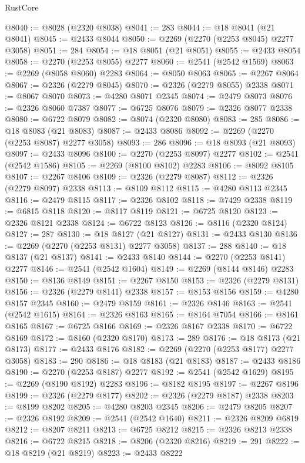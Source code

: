 \begin{lexlean}{RustCore}
\begin{coremodule}
@8040 := @8028 (@2320 @8038)
@8041 := 283
@8044 := @18 @8041 (@21 @8041)
@8045 := @2433 @8044
@8050 := @2269 (@2270 (@2253 @8045) @2277 @3058)
@8051 := 284
@8054 := @18 @8051 (@21 @8051)
@8055 := @2433 @8054
@8058 := @2270 (@2253 @8055) @2277
@8060 := @2541 (@2542 @1569)
@8063 := @2269 (@8058 @8060) @2283
@8064 := @8050 @8063
@8065 := @2267 @8064
@8067 := @2326 (@2279 @8045)
@8070 := @2326 (@2279 @8055) @2338
@8071 := @8067 @8070
@8073 := @4280 @8071 @2345
@8074 := @2479 @8073
@8076 := @2326 @8060 @7387
@8077 := @6725 @8076
@8079 := @2326 @8077 @2338
@8080 := @6722 @8079
@8082 := @8074 (@2320 @8080)
@8083 := 285
@8086 := @18 @8083 (@21 @8083)
@8087 := @2433 @8086
@8092 := @2269 (@2270 (@2253 @8087) @2277 @3058)
@8093 := 286
@8096 := @18 @8093 (@21 @8093)
@8097 := @2433 @8096
@8100 := @2270 (@2253 @8097) @2277
@8102 := @2541 (@2542 @1586)
@8105 := @2269 (@8100 @8102) @2283
@8106 := @8092 @8105
@8107 := @2267 @8106
@8109 := @2326 (@2279 @8087)
@8112 := @2326 (@2279 @8097) @2338
@8113 := @8109 @8112
@8115 := @4280 @8113 @2345
@8116 := @2479 @8115
@8117 := @2326 @8102
@8118 := @7429 @2338
@8119 := @6815 @8118
@8120 := @8117 @8119
@8121 := @6725 @8120
@8123 := @2326 @8121 @2338
@8124 := @6722 @8123
@8126 := @8116 (@2320 @8124)
@8127 := 287
@8130 := @18 @8127 (@21 @8127)
@8131 := @2433 @8130
@8136 := @2269 (@2270 (@2253 @8131) @2277 @3058)
@8137 := 288
@8140 := @18 @8137 (@21 @8137)
@8141 := @2433 @8140
@8144 := @2270 (@2253 @8141) @2277
@8146 := @2541 (@2542 @1604)
@8149 := @2269 (@8144 @8146) @2283
@8150 := @8136 @8149
@8151 := @2267 @8150
@8153 := @2326 (@2279 @8131)
@8156 := @2326 (@2279 @8141) @2338
@8157 := @8153 @8156
@8159 := @4280 @8157 @2345
@8160 := @2479 @8159
@8161 := @2326 @8146
@8163 := @2541 (@2542 @1615)
@8164 := @2326 @8163
@8165 := @8164 @7054
@8166 := @8161 @8165
@8167 := @6725 @8166
@8169 := @2326 @8167 @2338
@8170 := @6722 @8169
@8172 := @8160 (@2320 @8170)
@8173 := 289
@8176 := @18 @8173 (@21 @8173)
@8177 := @2433 @8176
@8182 := @2269 (@2270 (@2253 @8177) @2277 @3058)
@8183 := 290
@8186 := @18 @8183 (@21 @8183)
@8187 := @2433 @8186
@8190 := @2270 (@2253 @8187) @2277
@8192 := @2541 (@2542 @1629)
@8195 := @2269 (@8190 @8192) @2283
@8196 := @8182 @8195
@8197 := @2267 @8196
@8199 := @2326 (@2279 @8177)
@8202 := @2326 (@2279 @8187) @2338
@8203 := @8199 @8202
@8205 := @4280 @8203 @2345
@8206 := @2479 @8205
@8207 := @2326 @8192
@8209 := @2541 (@2542 @1640)
@8211 := @2326 @8209 @6819
@8212 := @8207 @8211
@8213 := @6725 @8212
@8215 := @2326 @8213 @2338
@8216 := @6722 @8215
@8218 := @8206 (@2320 @8216)
@8219 := 291
@8222 := @18 @8219 (@21 @8219)
@8223 := @2433 @8222

\end{coremodule}
\end{lexlean}
